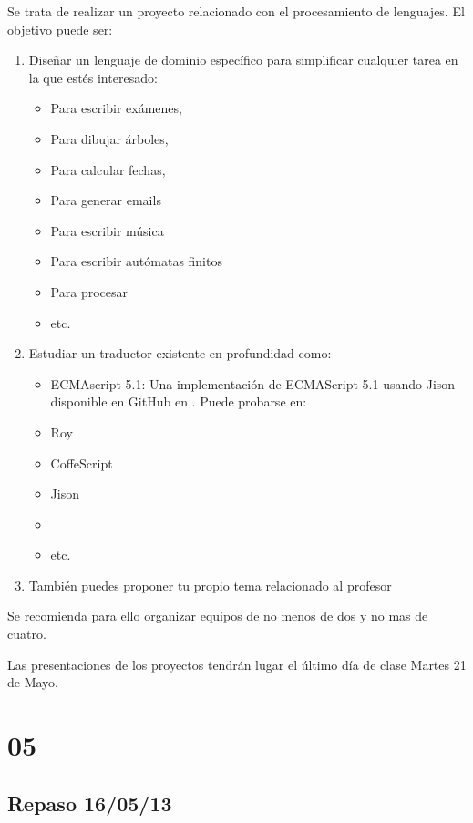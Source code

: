 Se trata de realizar un proyecto relacionado con el procesamiento de lenguajes.
El objetivo puede ser:


\begin{enumerate}
\item
Diseñar un lenguaje de dominio específico para simplificar cualquier tarea en la que estés interesado:

\begin{itemize}
\item
Para escribir exámenes, 
\item
Para dibujar árboles, 
\item
Para calcular fechas,
\item
Para generar emails
\item
Para escribir música
\item
Para escribir autómatas finitos
\item 
Para procesar 
\item
etc.
\end{itemize}
\item
Estudiar un traductor existente en profundidad  como:
\begin{itemize}
\item 
ECMAscript 5.1: 
 Una implementación de ECMAScript 5.1 usando Jison 
disponible 
en GitHub
 en
.
Puede probarse en:
\item Roy
\item CoffeScript
\item Jison
\item 
{}
\item etc.
\end{itemize}
\item
También puedes proponer tu propio tema relacionado al profesor
\end{enumerate}

Se recomienda para ello organizar equipos de no menos de dos y no mas de cuatro.

Las presentaciones de los proyectos tendrán lugar el último día de clase Martes 21 de Mayo.


\section{05}

\subsection{Repaso 16/05/13}
\begin{enumerate}

\end{enumerate}

